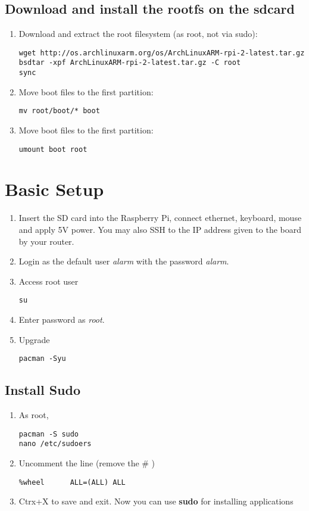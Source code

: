 \documentclass[journal,12pt,twocolumn]{IEEEtran}
\begin{document}
\subsection{Download and install the rootfs on the sdcard}
\begin{enumerate}[1.]
\item Download and extract the root filesystem (as root, not via sudo):
\begin{lstlisting}
wget http://os.archlinuxarm.org/os/ArchLinuxARM-rpi-2-latest.tar.gz
bsdtar -xpf ArchLinuxARM-rpi-2-latest.tar.gz -C root
sync
\end{lstlisting}
\item Move boot files to the first partition:
\begin{lstlisting}
mv root/boot/* boot
\end{lstlisting}
\item Move boot files to the first partition:
\begin{lstlisting}
umount boot root
\end{lstlisting}
\end{enumerate}
\section{Basic Setup}
\begin{enumerate}[1.]
\item Insert the SD card into the Raspberry Pi, connect ethernet, keyboard, mouse and apply 5V power. You may also SSH to the IP address given to the board by your router.
\item Login as the default user {\em alarm} with the password {\em alarm}.
\item Access root user 
\begin{lstlisting}
su
\end{lstlisting}
\item Enter password as {\em root}.
\item Upgrade
\begin{lstlisting}
pacman -Syu
\end{lstlisting}
\end{enumerate}
\subsection{Install Sudo}
\begin{enumerate}[1.]


\item As root, 
\begin{lstlisting}
pacman -S sudo
nano /etc/sudoers
\end{lstlisting}
\item Uncomment the line (remove the \# )
\begin{lstlisting}
%wheel      ALL=(ALL) ALL
\end{lstlisting}
\item Ctrx+X to save and exit. Now you can use \textbf{sudo} for installing applications 
\end{enumerate}
\end{document}
